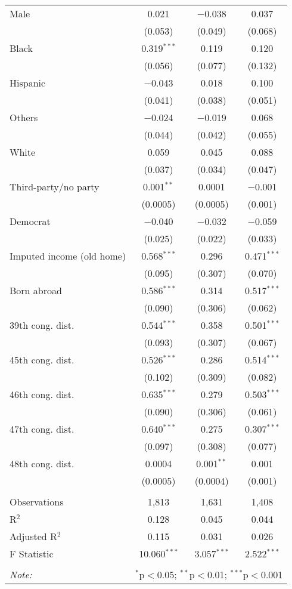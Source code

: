 \begin{tabular}{@{\extracolsep{5pt}}lccc}
  Male & 0.021 & $-$0.038 & 0.037 \\ 
  & (0.053) & (0.049) & (0.068) \\ 
  Black & 0.319$^{***}$ & 0.119 & 0.120 \\ 
  & (0.056) & (0.077) & (0.132) \\ 
  Hispanic & $-$0.043 & 0.018 & 0.100 \\ 
  & (0.041) & (0.038) & (0.051) \\ 
  Others & $-$0.024 & $-$0.019 & 0.068 \\ 
  & (0.044) & (0.042) & (0.055) \\ 
  White & 0.059 & 0.045 & 0.088 \\ 
  & (0.037) & (0.034) & (0.047) \\ 
  Third-party/no party & 0.001$^{**}$ & 0.0001 & $-$0.001 \\ 
  & (0.0005) & (0.0005) & (0.001) \\ 
  Democrat & $-$0.040 & $-$0.032 & $-$0.059 \\ 
  & (0.025) & (0.022) & (0.033) \\ 
  Imputed income (old home) & 0.568$^{***}$ & 0.296 & 0.471$^{***}$ \\ 
  & (0.095) & (0.307) & (0.070) \\ 
  Born abroad & 0.586$^{***}$ & 0.314 & 0.517$^{***}$ \\ 
  & (0.090) & (0.306) & (0.062) \\ 
  39th cong. dist. & 0.544$^{***}$ & 0.358 & 0.501$^{***}$ \\ 
  & (0.093) & (0.307) & (0.067) \\ 
  45th cong. dist. & 0.526$^{***}$ & 0.286 & 0.514$^{***}$ \\ 
  & (0.102) & (0.309) & (0.082) \\ 
  46th cong. dist. & 0.635$^{***}$ & 0.279 & 0.503$^{***}$ \\ 
  & (0.090) & (0.306) & (0.061) \\ 
  47th cong. dist. & 0.640$^{***}$ & 0.275 & 0.307$^{***}$ \\ 
  & (0.097) & (0.308) & (0.077) \\ 
  48th cong. dist. & 0.0004 & 0.001$^{**}$ & 0.001 \\ 
  & (0.0005) & (0.0004) & (0.001) \\ 
 \hline \\[-1.8ex] 
Observations & 1,813 & 1,631 & 1,408 \\ 
R$^{2}$ & 0.128 & 0.045 & 0.044 \\ 
Adjusted R$^{2}$ & 0.115 & 0.031 & 0.026 \\ 
F Statistic & 10.060$^{***}$ & 3.057$^{***}$ & 2.522$^{***}$ \\ 
\hline 
\hline \\[-1.8ex] 
\textit{Note:}  & \multicolumn{3}{r}{$^{*}$p$<$0.05; $^{**}$p$<$0.01; $^{***}$p$<$0.001} \\ 
\end{tabular} 

